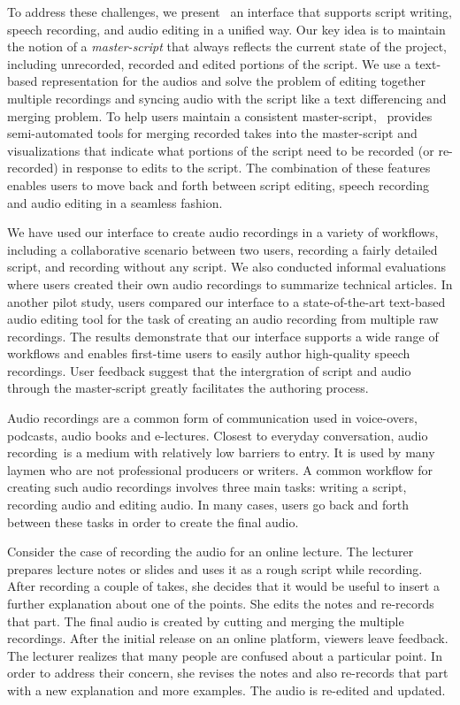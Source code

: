 To address these challenges, we present \systemname\, an interface that supports script writing, speech recording, and audio editing in a unified way. Our key idea is to maintain the notion of a \emph{master-script} that always reflects the current state of the project, including unrecorded, recorded and edited portions of the script. We use a text-based representation for the audios and solve the problem of editing together multiple recordings and syncing audio with the script like a text differencing and merging problem. To help users maintain a consistent master-script, \systemname\ provides semi-automated tools for merging recorded takes into the master-script and visualizations that indicate what portions of the script need to be recorded (or re-recorded) in response to edits to the script. The combination of these features enables users to move back and forth between script editing, speech recording and audio editing in a seamless fashion.

We have used our interface to create audio recordings in a variety of workflows, including a collaborative scenario between two users, recording a fairly detailed script, and recording without any script. We also conducted informal evaluations where users created their own audio recordings to summarize technical articles.   In another pilot study, users compared our interface to a state-of-the-art text-based audio editing tool for the task of creating an audio recording from multiple raw recordings. The results demonstrate that our interface supports a wide range of workflows and enables first-time users to  easily author high-quality speech recordings. User feedback suggest that the intergration of script and audio through the master-script greatly facilitates the authoring process. 

Audio recordings are a common form of communication used in voice-overs, podcasts, audio books and e-lectures. Closest to everyday conversation, audio recording\ is a medium with relatively low barriers to entry. It is used by many laymen who are not professional producers or writers. A common workflow for creating such audio recordings involves three main tasks: writing a script, recording audio and editing audio. In many cases, users go back and forth between these tasks in order to create the final audio. 

Consider the case of recording the audio for an online lecture. The lecturer prepares lecture notes or slides and uses it as a rough script while recording. After recording a couple of takes, she decides that it would be useful to insert a further explanation about one of the points. She edits the notes and re-records that part. The final audio is created by cutting and merging the multiple recordings. After the initial release on an online platform, viewers leave feedback. The lecturer realizes that many people are confused about a particular point. In order to address their concern, she revises the notes and also  re-records that part with a new explanation and more examples. The audio is re-edited and updated. 

